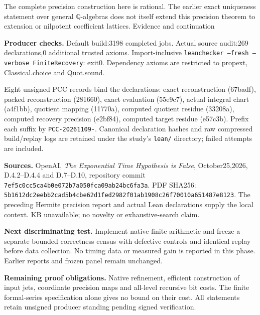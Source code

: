 \documentclass[11pt]{article}
\begin{document}
The complete precision construction here is rational. The earlier exact
uniqueness statement over general $\mathbb Q$-algebras does not itself extend
this precision theorem to extension or nilpotent coefficient lattices.
\newpage
{\Large Evidence and continuation}\par
\textbf{Producer checks.} Default build:3198 completed jobs. Actual source
audit:269 declarations,0 additional trusted axioms. Import-inclusive
\texttt{leanchecker --fresh --verbose FiniteRecovery}: exit0.
Dependency axioms are restricted to propext, Classical.choice and Quot.sound.

Eight unsigned PCC records bind the declarations: exact reconstruction
(67badf), packed reconstruction (281660), exact evaluation (55e9c7), actual
integral chart (a4f1bb), quotient mapping (11770a), computed quotient residue
(33208a), computed recovery precision (e2bf84), computed target residue
(e57c3b). Prefix each suffix by \texttt{PCC-20261109-}.
Canonical declaration hashes and raw compressed build/replay logs are retained
under the study's \texttt{lean/} directory; failed attempts are included.

\textbf{Sources.} OpenAI, \emph{The Exponential Time Hypothesis is False},
October25,2026, D.4.2--D.4.4 and D.7--D.10, repository commit
\texttt{7ef5c0cc5ca4b0e072b7a050fca09ab24bc6fa3a}.
PDF SHA256: \nolinkurl{5b1612dc2eebb2cad5b4cbe62d1fed2982f01ab1908c26f70010a651487e8123}.
The preceding Hermite precision report and actual Lean declarations supply
the local context. KB unavailable; no novelty or exhaustive-search claim.

\textbf{Next discriminating test.} Implement native finite arithmetic and
freeze a separate bounded correctness census with defective controls and
identical replay before data collection. No timing data or measured gain is
reported in this phase. Earlier reports and frozen panel remain unchanged.

\textbf{Remaining proof obligations.} Native refinement, efficient construction
of input jets, coordinate precision maps and all-level recursive bit costs.
The finite formal-series specification alone gives no bound on their cost.
All statements retain unsigned producer standing pending signed verification.
\end{document}
